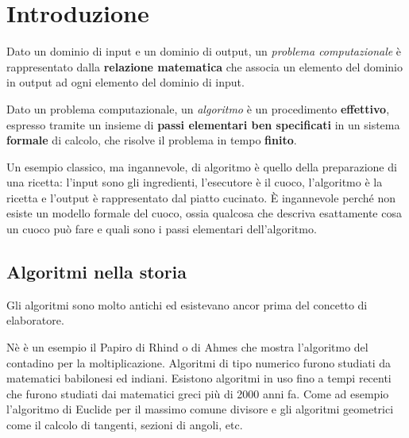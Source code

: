 
\ifsubfile
\pagestyle{plain}
\setcounter{chapter}{0}


\fi
\chapter{Introduzione}

\begin{definition*}
Dato un dominio di input e un dominio di output, un \emph{problema computazionale} è rappresentato dalla \textbf{relazione matematica} che associa un elemento del dominio in output ad ogni elemento del dominio di input.
\end{definition*}

\begin{definition*}[algoritmo]
Dato un problema computazionale, un \emph{algoritmo} è un procedimento \textbf{effettivo}, espresso tramite un insieme di \textbf{passi elementari ben specificati} in un sistema \textbf{formale} di calcolo, che risolve il problema in tempo \textbf{finito}.
\end{definition*}

Un esempio classico, ma ingannevole, di algoritmo è quello della preparazione di una ricetta: l'input sono gli ingredienti, l'esecutore è il cuoco, l'algoritmo è la ricetta e l'output è rappresentato dal piatto cucinato.
\`E ingannevole perché non esiste un modello formale del cuoco, ossia qualcosa che descriva esattamente cosa un cuoco può fare e quali sono i passi elementari dell'algoritmo.

\section*{Algoritmi nella storia}

Gli algoritmi sono molto antichi ed esistevano ancor prima del concetto di elaboratore.

Nè è un esempio il Papiro di Rhind o di Ahmes che mostra l'algoritmo del contadino per la moltiplicazione.
Algoritmi di tipo numerico furono studiati da matematici babilonesi ed indiani.
Esistono algoritmi in uso fino a tempi recenti che furono studiati dai matematici greci più di 2000 anni fa.
Come ad esempio l'algoritmo di Euclide per il massimo comune divisore e gli algoritmi geometrici come il calcolo di tangenti, sezioni di angoli, etc.\

